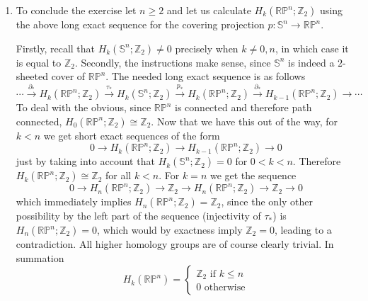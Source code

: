 \documentclass[a4paper, 12pt]{article}
\renewcommand{\S}{\mathbb{S}}
\newcommand{\Z}{\mathbb{Z}}
\newcommand{\R}{\mathbb{R}}
\renewcommand{\P}{\mathbb{P}}
\newcommand{\iso}{\cong}
\begin{document}
\begin{enumerate}
 	\item To conclude the exercise let $n \geq 2$ and let us calculate $H_k(\R\P^n; \Z_2)$ using the above long exact sequence for the covering projection $p\colon \S^n \to \R\P^n$.
 	
 	Firstly, recall that $H_k(\S^n; \Z_2) \neq 0$ precisely when $k \neq 0, n$, in which case it is equal to $\Z_2$. Secondly, the instructions make sense, since $\S^n$ is indeed a $2$-sheeted cover of $\R\P^n$. The needed long exact sequence is as follows
 	\[
 	\cdots \xrightarrow{\partial_*} H_k(\R\P^n; \Z_2) \xrightarrow{\tau_*} H_k(\S^n; \Z_2) \xrightarrow{p_*} H_k(\R\P^n; \Z_2) \xrightarrow{\partial_*} H_{k-1}(\R\P^n; \Z_2) \xrightarrow{} \cdots
 	\]
 	To deal with the obvious, since $\R\P^n$ is connected and therefore path connected, $H_0(\R\P^n; \Z_2) \iso \Z_2$. Now that we have this out of the way, for $k < n$ we get short exact sequences of the form
 	\[
 	0 \xrightarrow{} H_k(\R\P^n; \Z_2) \xrightarrow{} H_{k-1}(\R\P^n; \Z_2) \xrightarrow{} 0
 	\]
 	just by taking into account that $H_k(\S^n; \Z_2) = 0$ for $0 < k < n$. Therefore $H_k(\R\P^n; \Z_2) \iso \Z_2$ for all $k < n$.
 	For $k = n$ we get the sequence
 	\[
 	0 \xrightarrow{} H_n(\R\P^n; \Z_2) \xrightarrow{} \Z_2 \xrightarrow{} H_n(\R\P^n; \Z_2) \xrightarrow{} \Z_2 \xrightarrow{} 0
 	\]
 	which immediately implies $H_n(\R\P^n ; \Z_2) = \Z_2$, since the only other possibility by the left part of the sequence (injectivity of $\tau_*$) is $H_n (\R\P^n ; \Z_2) = 0$, which would by exactness imply $\Z_2 = 0$, leading to a contradiction. All higher homology groups are of course clearly trivial. In summation
 	\[
 	H_k(\R\P^n) = \begin{cases}
 	\Z_2 \text{ if $k \leq n$}\\
 	0 \text{ otherwise}
 	\end{cases}
 	\]
\end{enumerate}
\end{document}
